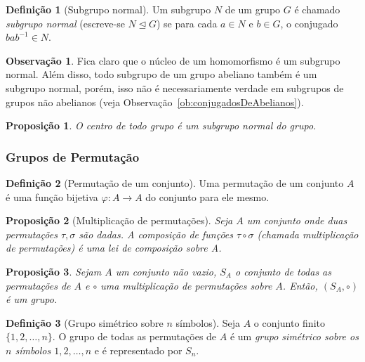 \documentclass[a4paper,12pt]{report}
\theoremstyle{plain}
\newtheorem{proposicao}{Proposição}[section]
\theoremstyle{definition}
\newtheorem{definicao}{Definição}[section]
\newtheorem{observacao}{Observação}[section]
\begin{document}
	\begin{definicao}[Subgrupo normal]
		Um subgrupo \(N\) de um grupo \(G\) é chamado \emph{subgrupo normal} (escreve-se $N\trianglelefteq G$) se para cada \(a\in N\) e \(b\in G\), o conjugado
		\(bab^{-1} \in N\).
	\end{definicao}
	
	\begin{observacao}
		Fica claro que o núcleo de um homomorfismo é um subgrupo normal. Além disso, todo subgrupo de um grupo abeliano também é um subgrupo normal, porém, isso não é
		necessariamente verdade em subgrupos de grupos não abelianos (veja Observação~\ref{ob:conjugadosDeAbelianos}). 
	\end{observacao}
	
	\begin{proposicao}
		O centro de todo grupo é um subgrupo normal do grupo.
	\end{proposicao}
	
	\subsubsection{Grupos de Permutação}
	
	\begin{definicao}[Permutação de um conjunto]
			Uma permutação de um conjunto $A$ é uma função bijetiva $\varphi: A \longrightarrow A$ do conjunto para ele mesmo.
	\end{definicao}
	
	\begin{proposicao}[Multiplicação de permutações]\label{def:multpermut}
		Seja $A$ um conjunto onde duas permutações $\tau,\sigma$ são dadas. A composição de funções $\tau\circ\sigma$ (chamada \emph{multiplicação de permutações}) é uma lei de composição sobre A.
	\end{proposicao}
	
	\begin{proposicao}
		Sejam $A$ um conjunto não vazio, $S_A$ o conjunto de todas as permutações de $A$ e $\circ$ uma multiplicação de permutações sobre $A$. Então, $(S_A, \circ)$ é um grupo.
	\end{proposicao}
	
	\begin{definicao}[Grupo simétrico sobre $n$ símbolos]
		Seja $A$ o conjunto finito $\{1,2,\dots, n\}$. O grupo de todas as permutações de $A$ é um \emph{grupo simétrico sobre os $n$ símbolos $1,2,\dots,n$} e é representado por $S_n$.	
	\end{definicao}
	
\end{document}
